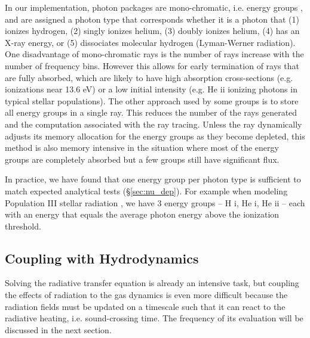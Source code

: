 \documentclass[useAMS,usenatbib]{mn2e}
\begin{document}
In our implementation, photon packages are mono-chromatic, i.e. energy
groups \citep[][Ch. 6]{Mihalas84}, and are assigned a photon type that
corresponds whether it is a photon that (1) ionizes hydrogen, (2)
singly ionizes helium, (3) doubly ionizes helium, (4) has an X-ray
energy, or (5) dissociates molecular hydrogen (Lyman-Werner
radiation).  One disadvantage of mono-chromatic rays is the number of
rays increase with the number of frequency bins.  However this allows
for early termination of rays that are fully absorbed, which are
likely to have high absorption cross-sections (e.g. \hi ionizations
near 13.6 eV) or a low initial intensity (e.g. He {\sc ii} ionizing
photons in typical stellar populations).  The other approach used by
some groups \citep[e.g.][]{Trac07} is to store all energy groups in a
single ray.  This reduces the number of the rays generated and the
computation associated with the ray tracing.  Unless the ray
dynamically adjusts its memory allocation for the energy groups as
they become depleted, this method is also memory intensive in the
situation where most of the energy groups are completely absorbed but
a few groups still have significant flux.

In practice, we have found that one energy group per photon type is
sufficient to match expected analytical tests (\S\ref{sec:nu_dep}).
For example when modeling Population III stellar radiation
\citep[e.g.][for hydrogen ionizing radiation only]{Abel07,
  Wise08_Gal}, we have 3 energy groups -- H {\sc i}, He {\sc i}, He
{\sc ii} -- each with an energy that equals the average photon energy
above the ionization threshold.

\subsection{Coupling with Hydrodynamics}
\label{sec:coupling}

Solving the radiative transfer equation is already an intensive task,
but coupling the effects of radiation to the gas dynamics is even more
difficult because the radiation fields must be updated on a timescale
such that it can react to the radiative heating, i.e. sound-crossing
time.  The frequency of its evaluation will be discussed in the next
section.
\end{document}
